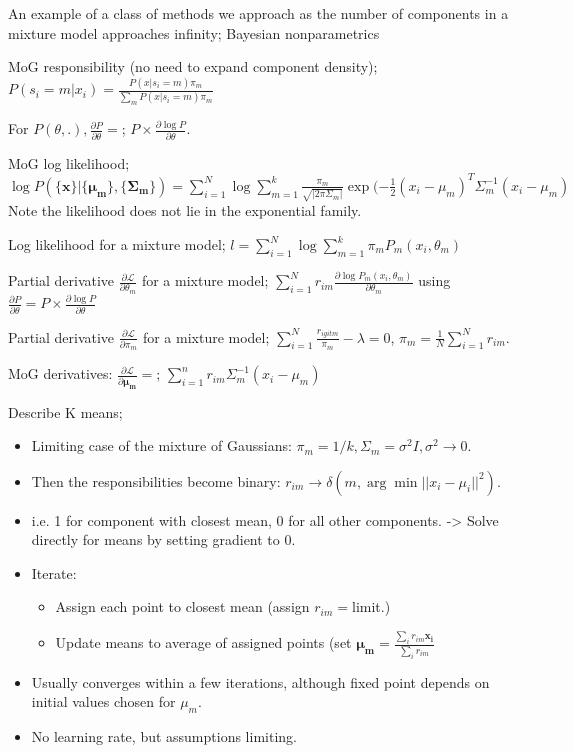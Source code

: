 \documentclass{article}
\begin{document}
An example of a class of methods we approach as the number of components in a mixture model approaches infinity; Bayesian nonparametrics

MoG responsibility (no need to expand component density); $P(s_i=m|x_i) = \frac{P(x|s_i=m)\pi_m}{\sum_m P(x|s_i=m)\pi_m}$

For $P(\theta, .), \frac{\partial P}{\partial \theta} =$; $P\times \frac{\partial\log P}{\partial \theta}$.

MoG log likelihood; $\log P(\{\mathbf{x}\}|\{\mathbf{\mu_m} \},\{\mathbf{\Sigma_m} \}) = \sum_{i=1}^N\log \sum_{m=1}^k \frac{\pi_m}{\sqrt{|2\pi\Sigma_m|}}\exp(-\frac{1}{2}(x_i-\mu_m)^T\Sigma^{-1}_m(x_i-\mu_m)$ \newline Note the likelihood does not lie in the exponential family.

Log likelihood for a mixture model; $l=\sum_{i=1}^N\log \sum_{m=1}^k \pi_mP_m(x_i, \theta_m)$

Partial derivative $\frac{\partial \mathcal{L}}{\partial \theta_m}$ for a mixture model; $\sum_{i=1}^N r_{im} \frac{\partial\log P_m(x_i, \theta_m)}{\partial\theta_m}$ using $\frac{\partial P}{\partial \theta} = P \times \frac{\partial\log P}{\partial \theta}$

Partial derivative $\frac{\partial \mathcal{L}}{\partial \pi_m}$ for a mixture model; $\sum_{i=1}^N \frac{r_{igit m}}{\pi_m}-\lambda = 0$, $\pi_m = \frac{1}{N}\sum_{i=1}^N r_{im}$.

MoG derivatives: $\frac{\partial \mathcal{L}}{\partial \mathbf{\mu_m}} =$; $\sum_{i=1}^n r_{im}\Sigma^{-1}_m(x_i-\mu_m)$


Describe K means; \begin{itemize} \item Limiting case of the mixture of Gaussians: $\pi_m = 1/k, \Sigma_m=\sigma^2I, \sigma^2\rightarrow 0$.  \item Then the responsibilities become binary: $r_{im}\rightarrow\delta(m, \arg\min ||x_i-\mu_i||^2)$.  \item i.e. 1 for component with closest mean, 0 for all other components. -> Solve directly for means by setting gradient to 0.  \item Iterate: \begin{itemize} \item Assign each point to closest mean (assign $r_{im}=$limit.) \item Update means to average of assigned points (set $\mathbf{\mu_m}=\frac{\sum_i r_{im}\mathbf{x_i}}{\sum_i r_{im}}$ \end{itemize} \item Usually converges within a few iterations, although fixed point depends on initial values chosen for $\mu_m$.  \item No learning rate, but assumptions limiting.  \end{itemize}
\end{document}

